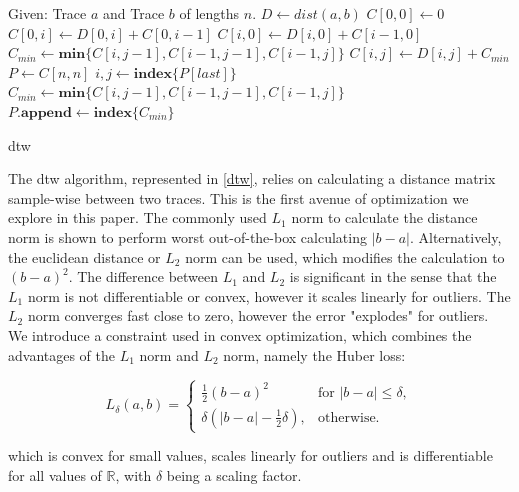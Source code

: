 \begin{algorithm}
\begin{algorithmic}
\State Given: Trace $a$ and Trace $b$ of lengths $n$.
    \State $D \gets dist(a,b)$
\EndFunction
{}
\State $C[0,0] \gets 0$
 
    \State $C[0,i] \gets D[0,i] + C[0,i-1]$
    \State $C[i,0] \gets D[i,0] + C[i-1,0]$
\EndFor
{} 
        \State $C_{min} \gets \textbf{min} \{C[i,j-1], C[i-1,j-1], C[i-1,j]\}$
        \State $C[i,j] \gets D[i,j] + C_{min}$
    \EndFor
\EndFor
\EndFunction
{}
\State $P \gets C[n,n]$
    \State $i, j \gets \textbf{index} \{ P[last] \}$
    \State $C_{min} \gets \textbf{min} \{C[i,j-1], C[i-1,j-1], C[i-1,j]\}$
    \State $P.\textbf{append} \gets \textbf{index} \{ C_{min} \}$
\EndWhile
\EndFunction
\State {}
\EndProcedure
\end{algorithmic}
\caption{\acl{dtw}} \label{dtw}
\end{algorithm}

The \ac{dtw} algorithm, represented in \cref{dtw}, relies on calculating a distance matrix sample-wise between two traces. This is the first avenue of optimization we explore in this paper. The commonly used $L_1$ norm to calculate the distance norm is shown to perform worst out-of-the-box calculating $|b-a|$. Alternatively, the euclidean distance or $L_2$ norm can be used, which modifies the calculation to $(b-a)^2$. The difference between $L_1$ and $L_2$ is significant in the sense that the $L_1$ norm is not differentiable or convex, however it scales linearly for outliers. The $L_2$ norm converges fast close to zero, however the error "explodes" for outliers. We introduce a constraint used in convex optimization, which combines the advantages of the $L_1$ norm and $L_2$ norm, namely the Huber loss:

\begin{equation}
L_\delta (a, b) = 
\begin{cases}
 \frac{1}{2} (b-a)^2 & \text{for } |b-a| \le \delta, \\
 \delta (|b-a| - \frac{1}{2} \delta), & \text{otherwise.}
\end{cases}
\label{eq:huber}
\end{equation}

which is convex for small values, scales linearly for outliers and is differentiable for all values of $\mathbb{R}$, with $\delta$ being a scaling factor.

